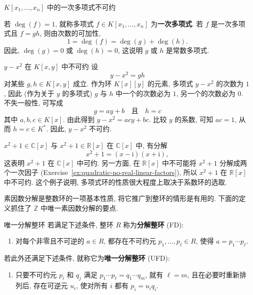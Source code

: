 \begin{Example}{{\textmd{$K[x_{1},\ldots,x_{n}]$} 中的一次多项式不可约}}
  \leavevmode\label{ex:linear-polynomials-irreducible}\strut\par\nopagebreak[4]\noindent
  若 $\deg(f)=1$, 就称多项式 $f\in K[x_{1},\ldots,x_{n}]$ 为\textbf{一次多项式}. 若 $f$ 是一次多项式且 $f=gh$, 则由次数的可加性,
  \[
    1=\deg(f)=\deg(g)+\deg(h).
  \]
  因此, $\deg(g)=0$ 或 $\deg(h)=0$, 这说明 $g$ 或 $h$ 是常数多项式.
\end{Example}

\begin{Example}{{\textmd{$y-x^{2}$} 在 \textmd{$K[x,y]$} 中不可约}}\label{ex:parabola-polynomial-irreducible}
  设
  \[
    y-x^{2}=gh
  \]
  对某些 $g,h\in K[x,y]$ 成立. 作为环 $K[x][y]$ 的元素, 多项式 $y-x^{2}$ 的次数为 $1$, 因此 (作为关于 $y$ 的多项式) $g$ 与 $h$ 中一个的次数必为 $1$, 另一个的次数必为 $0$. 不失一般性, 可写成
  \[
    g=ay+b\quad\text{且}\quad h=c
  \]
  其中 $a,b,c\in K[x]$. 由此得到 $y-x^{2}=acy+bc$. 比较 $y$ 的系数, 可知 $ac=1$, 从而 $h=c\in K^{*}$. 因此, $y-x^{2}$ 不可约.
\end{Example}

\begin{Example}{{\textmd{$x^{2}+1\in\mathbb{C}[x]$} 与 \textmd{$x^{2}+1\in\mathbb{R}[x]$}}}\label{ex:quadratic-over-complex-and-real}
  在 $\mathbb{C}[x]$ 中, 有分解
  \[
    x^{2}+1=(x-\mathrm{i})(x+\mathrm{i}),
  \]
  这表明 $x^{2}+1$ 在 $\mathbb{C}[x]$ 中可约. 另一方面, 在 $\mathbb{R}[x]$ 中不可能将 $x^{2}+1$ 分解成两个一次因子 (Exercise~\ref{ex:quadratic-no-real-linear-factors}), 所以 $x^{2}+1$ 在 $\mathbb{R}[x]$ 中不可约. 这个例子说明, 多项式环的性质很大程度上取决于系数环的选取.
\end{Example}

素因数分解是整数环的一项基本性质, 将它推广到整环的情形是有用的. 下面的定义抓住了 $\mathbb{Z}$ 中唯一素因数分解的要点.

\begin{Definition}{唯一分解整环}\label{def:unique-factorization-domain}
  若满足下述条件, 整环 $R$ 称为\textbf{分解整环} (FD):
  \begin{enumerate}[label=(\roman*)]
    \item 对每个非零且不可逆的 $a\in R$, 都存在不可约元 $p_{1},\ldots,p_{\ell}\in R$, 使得 $a=p_{1}\cdots p_{\ell}$.
  \end{enumerate}
  若此外还满足下述条件, 就称它为\textbf{唯一分解整环} (UFD):
  \begin{enumerate}[label=(\roman*),start=2]
    \item 只要不可约元 $p_{i}$ 和 $q_{j}$ 满足 $p_{1}\cdots p_{\ell}=q_{1}\cdots q_{m}$, 就有 $\ell=m$, 且在必要时重新排列后, 存在可逆元 $u_{i}$, 使对所有 $i$ 都有 $p_{i}=u_{i}q_{i}$.
  \end{enumerate}
\end{Definition}


